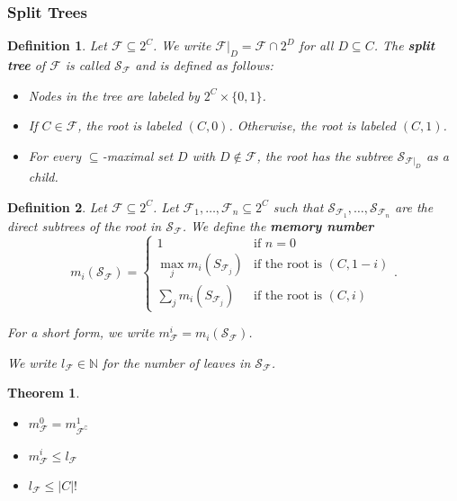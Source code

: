 \documentclass{article}
\newtheorem{theorem}{Theorem}
\newtheorem{definition}{Definition}
\begin{document}
\subsubsection{Split Trees}
\begin{definition}
	Let $\mathcal{F} \subseteq 2^C$. We write $\mathcal{F}|_D = \mathcal{F} \cap 2^D$ for all $D \subseteq C$. The \textbf{split tree} of $\mathcal{F}$ is called $\mathcal{S}_\mathcal{F}$ and is defined as follows: 
	\begin{itemize}
		\item Nodes in the tree are labeled by $2^C \times \{0,1\}$.
		\item If $C \in \mathcal{F}$, the root is labeled $(C, 0)$. Otherwise, the root is labeled $(C, 1)$.
		\item For every $\subseteq$-maximal set $D$ with $D \notin \mathcal{F}$, the root has the subtree $\mathcal{S}_{\mathcal{F}|_D}$ as a child.
	\end{itemize}
\end{definition}

\begin{definition}
	Let $\mathcal{F} \subseteq 2^C$. Let $\mathcal{F}_1, \dots, \mathcal{F}_n \subseteq 2^C$ such that $\mathcal{S}_{\mathcal{F}_1}, \dots, \mathcal{S}_{\mathcal{F}_n}$ are the direct subtrees of the root in $\mathcal{S}_\mathcal{F}$. We define the \textbf{memory number} 
	$$m_i(\mathcal{S}_\mathcal{F}) = \begin{cases}
		1 & \text{if } n = 0 \\
		\max_j m_i(S_{\mathcal{F}_j}) & \text{if the root is } (C, 1-i) \\
		\sum_j m_i(S_{\mathcal{F}_j}) & \text{if the root is } (C, i) 
	\end{cases}.$$
	
	For a short form, we write $m^i_\mathcal{F} = m_i(\mathcal{S}_\mathcal{F})$.
	
	We write $l_\mathcal{F} \in \mathbb{N}$ for the number of leaves in $\mathcal{S}_\mathcal{F}$.
\end{definition}

\begin{theorem}
\begin{itemize}
	\item $m^0_\mathcal{F} = m^1_{\mathcal{F}^\complement}$
	\item $m^i_\mathcal{F} \leq l_\mathcal{F}$
	\item $l_\mathcal{F} \leq |C|!$
\end{itemize}
\end{theorem}
\end{document}
